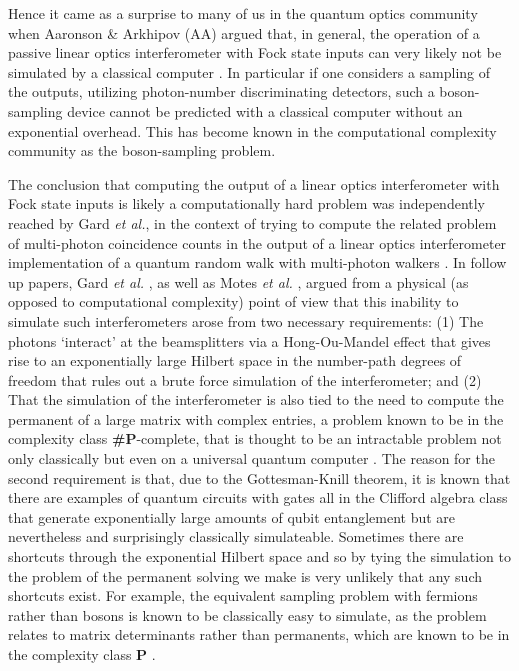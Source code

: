 \documentclass[aps,pra,twocolumn,amsmath,amssymb,nofootinbib,superscriptaddress]{revtex4}
\begin{document}
Hence it came as a surprise to many of us in the quantum optics community when Aaronson \& Arkhipov (AA) argued that, in general, the operation of a passive linear optics interferometer with Fock state inputs can very likely not be simulated by a classical computer \cite{aar}. In particular if one considers a sampling of the outputs, utilizing photon-number discriminating detectors, such a boson-sampling device cannot be predicted with a classical computer without an exponential overhead. This has become known in the computational complexity community as the boson-sampling problem. 

The conclusion that computing the output of a linear optics interferometer with Fock state inputs is likely a computationally hard problem was independently reached by Gard \emph{et al.}, in the context of trying to compute the related problem of multi-photon coincidence counts in the output of a linear optics interferometer implementation of a quantum random walk with multi-photon walkers \cite{gard2}. In follow up papers, Gard \emph{et al.} \cite{gard}, as well as Motes \emph{et al.} \cite{motes}, argued from a physical (as opposed to computational complexity) point of view that this inability to simulate such interferometers arose from two necessary requirements: (1) The photons `interact' at the beamsplitters via a Hong-Ou-Mandel effect that gives rise to an exponentially large Hilbert space in the number-path degrees of freedom that rules out a brute force simulation of the interferometer; and (2) That the simulation of the interferometer is also tied to the need to compute the permanent of a large matrix with complex entries, a problem known to be in the complexity class \textbf{\#P}-complete, that is thought to be an intractable problem not only classically but even on a universal quantum computer \cite{bib:Ryser63}. The reason for the second requirement is that, due to the Gottesman-Knill theorem, it is known that there are examples of quantum circuits with gates all in the Clifford algebra class that generate exponentially large amounts of qubit entanglement but are nevertheless and surprisingly classically simulateable. Sometimes there are shortcuts through the exponential Hilbert space and so by tying the simulation to the problem of the permanent solving we make is very unlikely that any such shortcuts exist. For example, the equivalent sampling problem with fermions rather than bosons is known to be classically easy to simulate, as the problem relates to matrix determinants rather than permanents, which are known to be in the complexity class \textbf{P} \cite{gard}.
\end{document}
